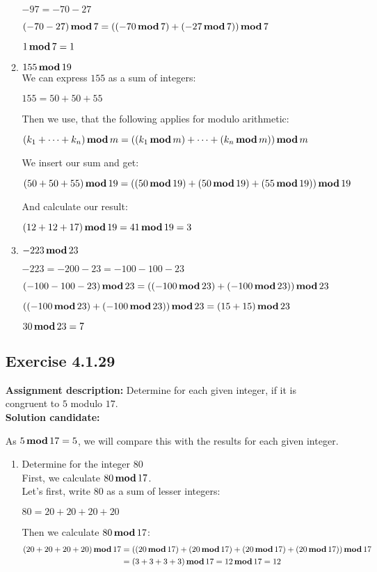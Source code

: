\documentclass{report}
\newcommand{\cent}[1]{\begin{center}#1\end{center}}
\newcommand{\mAlign}[1]{\begin{align*}#1\end{align*}}
\newcommand{\AssignmentDescription}{\textbf{Assignment description: }}
\newcommand{\Solution}{\textbf{Solution candidate: }}
\newcommand{\Exercise}[1]{\subsection{Exercise #1}}
\newcommand{\defaultEnumerateLabel}{\textbf{\alph*.}}
\newcommand{\modFunc}{\text{\,\textbf{mod}\,}}
\newcommand{\MyItem}[1]{\item #1\\}
\begin{document}
\begin{enumerate}[label=\defaultEnumerateLabel]
\begin{enumerate}[label=\defaultEnumerateLabel]
		\cent{$-97 = -70 -27$}
		
		\cent{$(-70-27) \modFunc 7 = ((-70 \modFunc 7) + (-27 \modFunc 7)) \modFunc 7 $}
		
		\cent{$ 1 \modFunc 7 = 1 $}
		
		\MyItem{$155 \modFunc 19$}
		
		We can express $155$ as a sum of integers:
		
		\cent{$155 =  50 + 50 + 55$}
		
		Then we use, that the following applies for modulo arithmetic:
		
		\cent{$(k_1  + \dots + k_n) \modFunc m = ((k_1 \modFunc m) + \dots + (k_n \modFunc m)) \modFunc m$}
		
		We insert our sum and get:
		\small
		\cent{$ (50 + 50 + 55) \modFunc 19 = ((50 \modFunc 19) + (50 \modFunc 19) + (55 \modFunc 19)) \modFunc 19$}
		\normalsize
		
		And calculate our result:
		
		\cent{$(12 + 12 + 17) \modFunc 19  = 41 \modFunc 19 = 3$}
		
		\MyItem{$-223 \modFunc 23$}
		
		\cent{$-223 = -200 - 23 = -100-100-23$}
		\small
		\cent{$(-100-100-23) \modFunc 23 = ((-100 \modFunc 23) + (-100 \modFunc 23)) \modFunc 23$}
		\normalsize
		
		\cent{$((-100 \modFunc 23) + (-100 \modFunc 23)) \modFunc 23 = (15+15) \modFunc 23$}
		
		\cent{$30 \modFunc 23 = 7$}
		
	\end{enumerate}
	
	\Exercise{4.1.29}
	\AssignmentDescription
	Determine for each given integer, if it is congruent to $5$ modulo $17$.\\
	
	\Solution
	
	As $5 \modFunc 17 = 5$, we will compare this with the results for each given integer.\\
	\begin{enumerate} [label=\defaultEnumerateLabel]
		\MyItem{Determine for the integer 80}
		
		First, we calculate $80 \modFunc 17$.\\
		
		Let's first, write 80 as a sum of lesser integers:
		\cent{$ 80  = 20 + 20 + 20 + 20$}
		
		Then we calculate $80 \modFunc 17$:
		\tiny
		\mAlign{(20+20+20+20) \modFunc 17 &= ((20 \modFunc 17) + (20 \modFunc 17) + (20 \modFunc 17) + (20 \modFunc 17)) \modFunc 17 \\
						&= (3+3+3+3) \modFunc17 = 12 \modFunc 17 = 12}
		\normalsize
		

\end{enumerate}
\end{enumerate}
\end{document}

